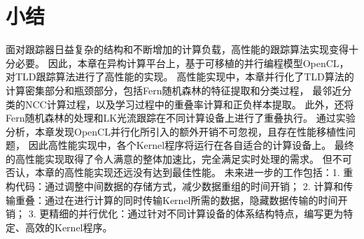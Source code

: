\section{小结}
面对跟踪器日益复杂的结构和不断增加的计算负载，高性能的跟踪算法实现变得十分必要。
因此，本章在异构计算平台上，基于可移植的并行编程模型OpenCL，对TLD跟踪算法进行了高性能的实现。
高性能实现中，本章并行化了TLD算法的计算密集部分和瓶颈部分，包括Fern随机森林的特征提取和分类过程，
最邻近分类的NCC计算过程，以及学习过程中的重叠率计算和正负样本提取。
此外，还将Fern随机森林的处理和LK光流跟踪在不同计算设备上进行了重叠执行。
通过实验分析，本章发现OpenCL并行化所引入的额外开销不可忽视，且存在性能移植性问题，
因此高性能实现中，各个Kernel程序将运行在各自适合的计算设备上。
最终的高性能实现取得了令人满意的整体加速比，完全满足实时处理的需求。
但不可否认，本章的高性能实现还远没有达到最佳性能。
未来进一步的工作包括：1. 重构代码：通过调整中间数据的存储方式，减少数据重组的时间开销；
2. 计算和传输重叠：通过在进行计算的同时传输Kernel所需的数据，隐藏数据传输的时间开销；
3. 更精细的并行优化：通过针对不同计算设备的体系结构特点，编写更为特定、高效的Kernel程序。
